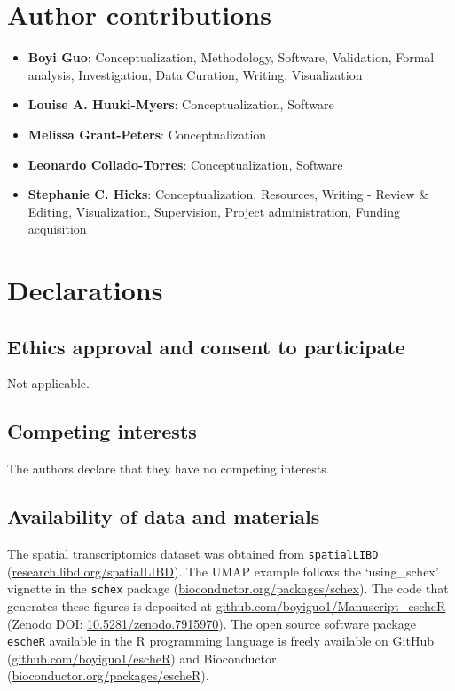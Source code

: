 \documentclass[10pt,twocolumn]{article}
\begin{document}
\section*{Author contributions}

\begin{itemize}[nosep]
    \item \textbf{Boyi Guo}:  Conceptualization, Methodology, Software, Validation, Formal analysis, Investigation, Data Curation, Writing, Visualization
    \item \textbf{Louise A. Huuki-Myers}: Conceptualization, Software
    \item \textbf{Melissa Grant-Peters}: Conceptualization
    \item \textbf{Leonardo Collado-Torres}: Conceptualization, Software
    \item \textbf{Stephanie C. Hicks}: Conceptualization, Resources, Writing - Review \& Editing, Visualization, Supervision, Project administration, Funding acquisition
\end{itemize}

\section*{Declarations}

\subsection*{Ethics approval and consent to participate}
Not applicable.

\subsection*{Competing interests}
The authors declare that they have no competing interests.

\subsection*{Availability of data and materials}
The spatial transcriptomics dataset was obtained from \texttt{spatialLIBD} (\href{http://research.libd.org/spatialLIBD}{research.libd.org/spatialLIBD}). The UMAP example follows the `using\_schex' vignette in the \texttt{schex} package (\href{https://www.bioconductor.org/packages/schex}{bioconductor.org/packages/schex}). The code that generates these figures is deposited at \href{https://github.com/boyiguo1/Manuscript_escheR}{github.com/boyiguo1/Manuscript\_escheR} (Zenodo DOI: \href{https://zenodo.org/record/7915970}{10.5281/zenodo.7915970}). The open source software package \texttt{escheR} available in the R programming language is freely available on GitHub (\href{https://github.com/boyiguo1/escheR}{github.com/boyiguo1/escheR}) and Bioconductor (\href{https://bioconductor.org/packages/escheR}{bioconductor.org/packages/escheR}).
\end{document}
